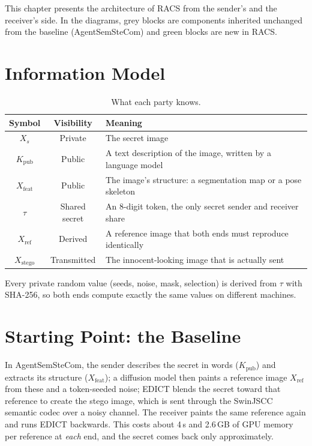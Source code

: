 This chapter presents the architecture of RACS from the sender's and the receiver's side.
In the diagrams, grey blocks are components inherited unchanged from the baseline
(AgentSemSteCom) and green blocks are new in RACS.

\section{Information Model}
\begin{table}[H]
	\centering
	\caption{What each party knows.}
	\label{tab:info}
	\begin{tabularx}{\textwidth}{|c|c|X|}
		\hline
		\textbf{Symbol} & \textbf{Visibility} & \textbf{Meaning} \\ \hline
		$X_s$ & Private & The secret image \\ \hline
		$K_{\mathrm{pub}}$ & Public & A text description of the image, written by a language model \\ \hline
		$X_{\mathrm{feat}}$ & Public & The image's structure: a segmentation map or a pose skeleton \\ \hline
		$\tau$ & Shared secret & An 8-digit token, the only secret sender and receiver share \\ \hline
		$X_{\mathrm{ref}}$ & Derived & A reference image that both ends must reproduce identically \\ \hline
		$X_{\mathrm{stego}}$ & Transmitted & The innocent-looking image that is actually sent \\ \hline
	\end{tabularx}
\end{table}

Every private random value (seeds, noise, mask, selection) is derived from $\tau$ with SHA-256,
so both ends compute exactly the same values on different machines.

\section{Starting Point: the Baseline}
In AgentSemSteCom, the sender describes the secret in words ($K_{\mathrm{pub}}$) and extracts its
structure ($X_{\mathrm{feat}}$); a diffusion model then paints a reference image $X_{\mathrm{ref}}$
from these and a token-seeded noise; EDICT blends the secret toward that reference to create the
stego image, which is sent through the SwinJSCC semantic codec over a noisy channel. The receiver
paints the same reference again and runs EDICT backwards. This costs about 4\,s and 2.6\,GB of
GPU memory per reference at \emph{each} end, and the secret comes back only approximately.

